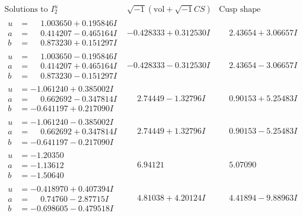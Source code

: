 \documentclass[1p]{elsarticle_modified}
\theoremstyle{definition}
\newcommand{\I}{\sqrt{-1}}
\begin{document}
$$\begin{array}{c|c|c}  
\text{Solutions to }I^u_{2}& \I (\text{vol} + \sqrt{-1}CS) & \text{Cusp shape}\\
 \hline 
\begin{aligned}
u &= \phantom{-}1.003650 + 0.195846 I \\
a &= \phantom{-}0.414207 - 0.465164 I \\
b &= \phantom{-}0.873230 + 0.151297 I\end{aligned}
 & -0.428333 + 0.312530 I & \phantom{-}2.43654 + 3.06657 I \\ \hline\begin{aligned}
u &= \phantom{-}1.003650 - 0.195846 I \\
a &= \phantom{-}0.414207 + 0.465164 I \\
b &= \phantom{-}0.873230 - 0.151297 I\end{aligned}
 & -0.428333 - 0.312530 I & \phantom{-}2.43654 - 3.06657 I \\ \hline\begin{aligned}
u &= -1.061240 + 0.385002 I \\
a &= \phantom{-}0.662692 - 0.347814 I \\
b &= -0.641197 + 0.217090 I\end{aligned}
 & \phantom{-}2.74449 - 1.32796 I & \phantom{-}0.90153 + 5.25483 I \\ \hline\begin{aligned}
u &= -1.061240 - 0.385002 I \\
a &= \phantom{-}0.662692 + 0.347814 I \\
b &= -0.641197 - 0.217090 I\end{aligned}
 & \phantom{-}2.74449 + 1.32796 I & \phantom{-}0.90153 - 5.25483 I \\ \hline\begin{aligned}
u &= -1.20350\phantom{ +0.000000I} \\
a &= -1.13612\phantom{ +0.000000I} \\
b &= -1.50640\phantom{ +0.000000I}\end{aligned}
 & \phantom{-}6.94121\phantom{ +0.000000I} & \phantom{-}5.07090\phantom{ +0.000000I} \\ \hline\begin{aligned}
u &= -0.418970 + 0.407394 I \\
a &= \phantom{-}0.74760 - 2.87715 I \\
b &= -0.698605 - 0.479518 I\end{aligned}
 & \phantom{-}4.81038 + 4.20124 I & \phantom{-}4.41894 - 9.88963 I \\ \hline\begin{aligned}

\end{aligned}
\end{array}$$
\end{document}
